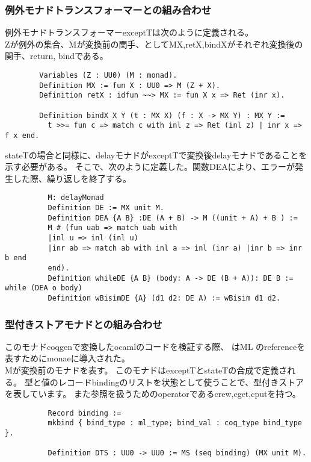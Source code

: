 \documentclass[japanese]{jssst_ppl}
\theoremstyle{definition}
\begin{document}
\subsubsection{例外モナドトランスフォーマーとの組み合わせ}
例外モナドトランスフォーマーexceptTは次のように定義される。\\
Zが例外の集合、Mが変換前の関手、としてMX,retX,bindXがそれぞれ変換後の関手、return, bindである。

\begin{verbatim}
        Variables (Z : UU0) (M : monad).
        Definition MX := fun X : UU0 => M (Z + X).
        Definition retX : idfun ~~> MX := fun X x => Ret (inr x).
        
        Definition bindX X Y (t : MX X) (f : X -> MX Y) : MX Y :=
          t >>= fun c => match c with inl z => Ret (inl z) | inr x => f x end.
        \end{verbatim}
stateTの場合と同様に、delayモナドがexceptTで変換後delayモナドであることを示す必要がある。
そこで、次のように定義した。関数DEAにより、エラーが発生した際、繰り返しを終了する。

\begin{verbatim}
          M: delayMonad
          Definition DE := MX unit M.
          Definition DEA {A B} :DE (A + B) -> M ((unit + A) + B ) :=
          M # (fun uab => match uab with
          |inl u => inl (inl u)
          |inr ab => match ab with inl a => inl (inr a) |inr b => inr b end
          end).
          Definition whileDE {A B} (body: A -> DE (B + A)): DE B := while (DEA o body)
          Definition wBisimDE {A} (d1 d2: DE A) := wBisim d1 d2.
        \end{verbatim}

\subsubsection{型付きストアモナドとの組み合わせ}
このモナドcoqgenで変換したocamlのコードを検証する際、
はML のreferenceを表すためにmonaeに導入された。\\
Mが変換前のモナドを表す。
このモナドはexceptTとstateTの合成で定義される。
型と値のレコードbindingのリストを状態として使うことで、型付きストアを表しています。
また参照を扱うためのoperatorであるcrew,cget,cputを持つ。
\begin{verbatim}
          Record binding :=
          mkbind { bind_type : ml_type; bind_val : coq_type bind_type }.
        
          Definition DTS : UU0 -> UU0 := MS (seq binding) (MX unit M).
        \end{verbatim}
\end{document}
